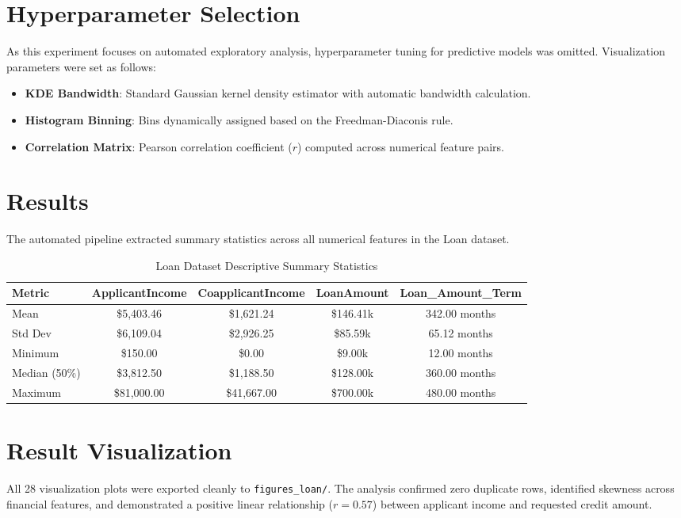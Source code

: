 \documentclass[12pt,a4paper]{article}
\begin{document}
\section{Hyperparameter Selection}
As this experiment focuses on automated exploratory analysis, hyperparameter tuning for predictive models was omitted. Visualization parameters were set as follows:
\begin{itemize}[noitemsep]
    \item \textbf{KDE Bandwidth}: Standard Gaussian kernel density estimator with automatic bandwidth calculation.
    \item \textbf{Histogram Binning}: Bins dynamically assigned based on the Freedman-Diaconis rule.
    \item \textbf{Correlation Matrix}: Pearson correlation coefficient ($r$) computed across numerical feature pairs.
\end{itemize}

\section{Results}
The automated pipeline extracted summary statistics across all numerical features in the Loan dataset.

\begin{table}[H]
\centering
\caption{Loan Dataset Descriptive Summary Statistics}
\label{tab:loan_stats}
\begin{tabular}{lcccc}
\toprule
Metric & ApplicantIncome & CoapplicantIncome & LoanAmount & Loan\_Amount\_Term \\
\midrule
Mean & \$5,403.46 & \$1,621.24 & \$146.41k & 342.00 months \\
Std Dev & \$6,109.04 & \$2,926.25 & \$85.59k & 65.12 months \\
Minimum & \$150.00 & \$0.00 & \$9.00k & 12.00 months \\
Median (50\%) & \$3,812.50 & \$1,188.50 & \$128.00k & 360.00 months \\
Maximum & \$81,000.00 & \$41,667.00 & \$700.00k & 480.00 months \\
\bottomrule
\end{tabular}
\end{table}

\section{Result Visualization}
All 28 visualization plots were exported cleanly to \texttt{figures\_loan/}. The analysis confirmed zero duplicate rows, identified skewness across financial features, and demonstrated a positive linear relationship ($r = 0.57$) between applicant income and requested credit amount.
\end{document}
